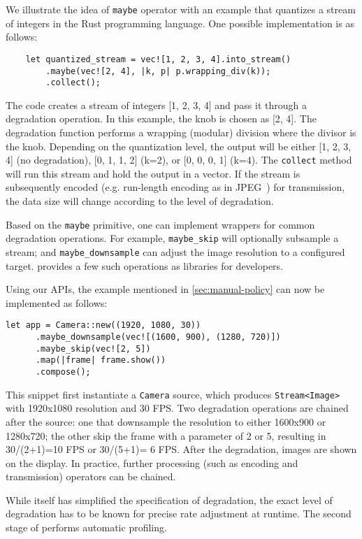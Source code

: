 We illustrate the idea of \texttt{maybe} operator with an example that quantizes
a stream of integers in the Rust programming language. One possible
implementation is as follows:

\vspace{-2pt}
\begin{lstlisting}
    let quantized_stream = vec![1, 2, 3, 4].into_stream()
        .maybe(vec![2, 4], |k, p| p.wrapping_div(k));
        .collect();
\end{lstlisting}

The code creates a stream of integers [1, 2, 3, 4] and pass it through a
degradation operation. In this example, the knob is chosen as [2, 4]. The
degradation function performs a wrapping (modular) division where the divisor is
the knob. Depending on the quantization level, the output will be either [1, 2,
3, 4] (no degradation), [0, 1, 1, 2] (k=2), or [0, 0, 0, 1] (k=4). The
\texttt{collect} method will run this stream and hold the output in a vector.
If the stream is subsequently encoded (e.g. run-length encoding as in
JPEG~\cite{wallace1992jpeg}) for transmission, the data size will change
according to the level of degradation.

Based on the \texttt{maybe} primitive, one can implement wrappers for common
degradation operations. For example, \texttt{maybe\_skip} will optionally
subsample a stream; and \texttt{maybe\_downsample} can adjust the image
resolution to a configured target. \sysname{} provides a few such operations as
libraries for developers.

Using our APIs, the example mentioned in \autoref{sec:manual-policy} can now be
implemented as follows:

\vspace{-2pt}
\begin{lstlisting}[caption={Video Processing Example}, label={lst:ex}]
   let app = Camera::new((1920, 1080, 30))
      .maybe_downsample(vec![(1600, 900), (1280, 720)])
      .maybe_skip(vec![2, 5])
      .map(|frame| frame.show())
      .compose();
\end{lstlisting}

This snippet first instantiate a \texttt{Camera} source, which produces
\texttt{Stream<Image>} with 1920x1080 resolution and 30 FPS. Two degradation
operations are chained after the source: one that downsample the resolution to
either 1600x900 or 1280x720; the other skip the frame with a parameter of 2 or
5, resulting in 30/(2+1)=10 FPS or 30/(5+1)= 6 FPS. After the degradation,
images are shown on the display. In practice, further processing (such as
encoding and transmission) operators can be chained.

While \maybe{} itself has simplified the specification of degradation, the exact
level of degradation has to be known for precise rate adjustment at runtime. The
second stage of \sysname{} performs automatic profiling.

